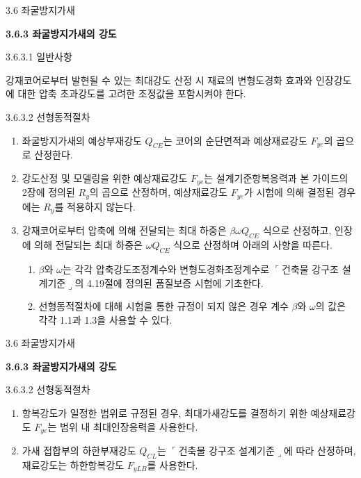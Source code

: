 \begin{frame}{3.6 좌굴방지가새}

	\textbf{3.6.3 좌굴방지가새의 강도}

3.6.3.1 일반사항

강재코어로부터 발현될 수 있는 최대강도 산정 시 재료의 변형도경화 효과와 인장강도에 대한 압축 초과강도를 고려한 조정값을 포함시켜야 한다. 

3.6.3.2 선형동적절차

\begin{enumerate}
	\item[(1)] 좌굴방지가새의 예상부재강도 $Q_{CE}$는 코어의 순단면적과 예상재료강도 $F_{ye}$의 곱으로 산정한다. 
	\item[(2)] 강도산정 및 모델링을 위한 예상재료강도 $F_{ye}$는 설계기준항복응력과 본 가이드의 2장에 정의된 $R_y$의 곱으로 산정하며, 예상재료강도 $F_{ye}$가 시험에 의해 결정된 경우에는 $R_y$를 적용하지 않는다. 
	\item[(3)] 강재코어로부터 압축에 의해 전달되는 최대 하중은 $\beta\omega Q_{CE}$ 식으로 산정하고, 인장에 의해 전달되는 최대 하중은 $\omega Q_{CE}$ 식으로 산정하며 아래의 사항을 따른다. 
	\begin{enumerate}[label=\large\protect\textcircled{\small\arabic*}]
		\item $\beta$와 $\omega$는 각각 압축강도조정계수와 변형도경화조정계수로 $\ulcorner$건축물 강구조 설계기준$\lrcorner$의 4.19절에 정의된 품질보증 시험에 기초한다.
		\item 선형동적절차에 대해 시험을 통한 규정이 되지 않은 경우 계수 $\beta$와 $\omega$의 값은 각각 1.1과 1.3을 사용할 수 있다.
	\end{enumerate}
	\end{enumerate}
	\end{frame}
	
\begin{frame}{3.6 좌굴방지가새}

	\textbf{3.6.3 좌굴방지가새의 강도}	

3.6.3.2 선형동적절차
	\begin{enumerate}		
	\item[(4)] 항복강도가 일정한 범위로 규정된 경우, 최대가새강도를 결정하기 위한 예상재료강도 $F_{ye}$는 범위 내 최대인장응력을 사용한다.
	\item[(5)] 가새 접합부의 하한부재강도 $Q_{CL}$는 $\ulcorner$건축물 강구조 설계기준$\lrcorner$에 따라 산정하며, 재료강도는 하한항복강도 $F_{yLB}$를 사용한다. 
	\end{enumerate}
\end{frame}	


